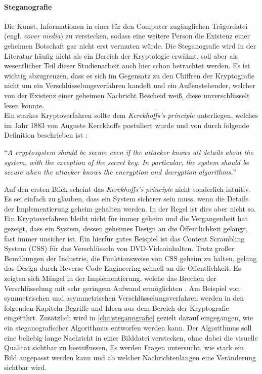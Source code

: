 \paragraph{Steganografie}
Die Kunst, Informationen in einer für den Computer
zugänglichen Trä\-gerdatei (engl. \textit{cover media}) zu verstecken, sodass eine
weitere Person die Existenz einer geheimen Botschaft gar nicht erst vermuten würde.
Die Steganografie wird in der Literatur häufig nicht als ein Bereich der Kryptologie
erwähnt, soll aber als wesentlicher Teil dieser Studienarbeit auch hier
schon betrachtet werden. Es ist wichtig abzugrenzen, dass es sich
im Gegensatz zu den Chiffren der Kryptografie nicht um ein Verschlüsselungsverfahren handelt
und ein Außenstehender, welcher von der Existenz einer geheimen Nachricht Bescheid weiß,
diese unverschlüsselt lesen könnte.\\[8pt]
Ein starkes Kryptoverfahren sollte dem \textit{Kerckhoffs's principle} unterliegen, welches
im Jahr 1883 von Auguste Kerckhoffs postuliert wurde und von \citeauthor{BOOK:crypto}
durch folgende Definition beschrieben ist \parencite*[11]{BOOK:crypto}:

\begin{definition}
  \enquote{\textit{A cryptosystem should be secure even if the attacker knows all details about
      the system, with the exception of the secret key. In particular, the system should be secure when
      the attacker knows the encryption and decryption algorithms.}}
\end{definition}

\noindent
Auf den ersten Blick scheint das \textit{Kerckhoffs's principle} nicht sonderlich intuitiv.
Es sei einfach zu glauben, dass ein System
sicherer sein muss, wenn die Details der Implementierung geheim gehalten werden.
In der Regel ist dies aber nicht so. Ein Kryptoverfahren bleibt nicht für immer geheim und die
Vergangenheit hat gezeigt, dass ein System, dessen geheimes Design an die Öffentlichkeit
gelangt, fast immer unsicher ist. Ein hierfür gutes Beispiel ist das Content Scrambling System (CSS)
für das Verschlüsseln von DVD-Videoinhalten. Trotz großer Bemühungen der Industrie, die
Funktionsweise von CSS geheim zu halten, gelang das Design durch Reverse Code Engineering
schnell an die Öffentlichkeit. Es zeigten sich Mängel in der Implementierung,
welche das Brechen der Verschlüsselung mit sehr geringem Aufwand ermöglichten \parencite{SITE:CSS}.
Am Beispiel von symmetrischen und asymmetrischen Verschlüsselungsverfahren werden in den
folgenden Kapiteln Begriffe und Ideen aus dem Bereich der Kryptografie eingeführt.
Zusätzlich wird in \autoref{cha:steganografie} gezielt darauf eingegangen,
wie ein steganografischer Algorithmus entworfen werden kann.
Der Algorithmus soll eine beliebig lange Nachricht in einer Bilddatei verstecken,
ohne dabei die visuelle Qualität sichtbar zu beeinflussen. Es werden Fragen untersucht,
wie stark ein Bild angepasst werden kann und ab welcher Nachrichtenlängen
eine Veränderung sichtbar wird.

